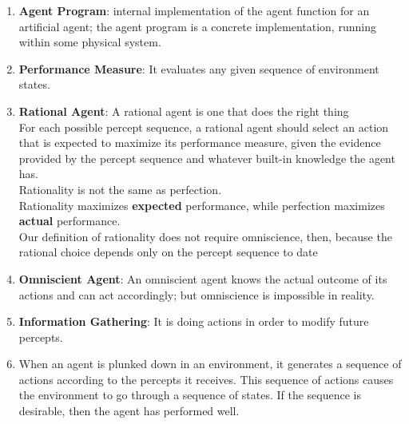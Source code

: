 \begin{enumerate}[itemsep=0.2cm]
    \item \textbf{Agent Program}: internal implementation of the agent function for an artificial agent; the agent program is a concrete implementation, running within some physical system.
    \hfill \cite{ai/book/Artificial-Intelligence-A-Modern-Approach/Russell-Norvig}

    \item \textbf{Performance Measure}: It evaluates any given sequence of environment states.
    \hfill \cite{ai/book/Artificial-Intelligence-A-Modern-Approach/Russell-Norvig}

    \item \textbf{Rational Agent}: A rational agent is one that does the right thing
    \hfill \cite{ai/book/Artificial-Intelligence-A-Modern-Approach/Russell-Norvig}
    \\
    For each possible percept sequence, a rational agent should select an action that is expected to maximize its performance measure, given the evidence provided by the percept sequence and whatever built-in knowledge the agent has.
    \hfill \cite{ai/book/Artificial-Intelligence-A-Modern-Approach/Russell-Norvig}
    \\
    Rationality is not the same as perfection.
    \hfill \cite{ai/book/Artificial-Intelligence-A-Modern-Approach/Russell-Norvig}
    \\
    Rationality maximizes \textbf{expected} performance, while perfection maximizes \textbf{actual} performance.
    \hfill \cite{ai/book/Artificial-Intelligence-A-Modern-Approach/Russell-Norvig}
    \\
    Our definition of rationality does not require omniscience, then, because the rational choice depends only on the percept sequence to date
    \hfill \cite{ai/book/Artificial-Intelligence-A-Modern-Approach/Russell-Norvig}


    \item \textbf{Omniscient Agent}: An omniscient agent knows the actual outcome of its actions and can act accordingly; but omniscience is impossible in reality. 
    \hfill \cite{ai/book/Artificial-Intelligence-A-Modern-Approach/Russell-Norvig}


    \item \textbf{Information Gathering}: It is doing actions in order to modify future percepts.
    \hfill \cite{ai/book/Artificial-Intelligence-A-Modern-Approach/Russell-Norvig}


    

    \item When an agent is plunked down in an environment, it generates a sequence of actions according to the percepts it receives. This sequence of actions causes the environment to go through a sequence of states. If the sequence is desirable, then the agent has performed well.
    \hfill \cite{ai/book/Artificial-Intelligence-A-Modern-Approach/Russell-Norvig}


\end{enumerate}
